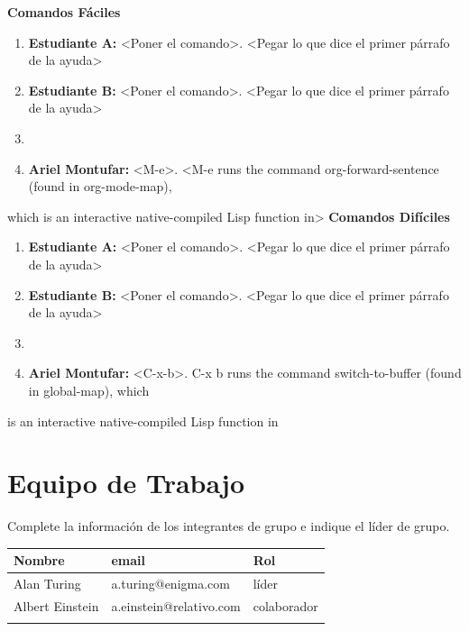 \documentclass{article}
\begin{document}
\textbf{\textbf{Comandos Fáciles}}
\begin{enumerate}
\item \textbf{\textbf{Estudiante A:}} <Poner el comando>. <Pegar lo que dice el primer párrafo de la ayuda>
\item \textbf{\textbf{Estudiante B:}} <Poner el comando>. <Pegar lo que dice el primer párrafo de la ayuda>
\item 

\item \textbf{\textbf{Ariel Montufar:}} <M-e>. <M-e runs the command org-forward-sentence (found in org-mode-map),
\end{enumerate}
which is an interactive native-compiled Lisp function in>
\textbf{\textbf{Comandos Difíciles}}
\begin{enumerate}
\item \textbf{\textbf{Estudiante A:}} <Poner el comando>. <Pegar lo que dice el primer párrafo de la ayuda>
\item \textbf{\textbf{Estudiante B:}} <Poner el comando>. <Pegar lo que dice el primer párrafo de la ayuda>
\item 

\item \textbf{\textbf{Ariel Montufar:}} <C-x-b>. C-x b runs the command switch-to-buffer (found in global-map), which
\end{enumerate}
is an interactive native-compiled Lisp function in  
\section{Equipo de Trabajo}
\label{sec:orgf190009}
Complete la información de los integrantes de grupo e indique el líder
de grupo.

\begin{center}
\begin{tabular}{lll}
\hline
Nombre & email & Rol\\[0pt]
\hline
Alan Turing & a.turing@enigma.com & líder\\[0pt]
Albert Einstein & a.einstein@relativo.com & colaborador\\[0pt]
 &  & \\[0pt]
\hline
\end{tabular}
\end{center}
\end{document}

